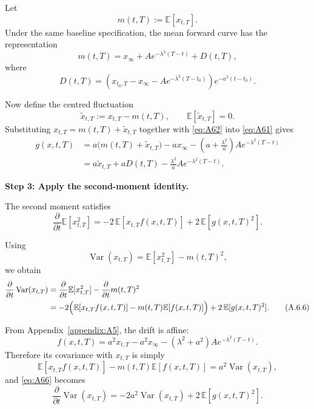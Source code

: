 \documentclass[12pt]{article}
\theoremstyle{statementstyle}
\begin{document}
\begin{appendices}
Let
\[
m(t,T):=\mathbb{E}[x_{t,T}].
\]
Under the same baseline specification, the mean forward curve has the
representation
\begin{equation}
m(t,T)
=
x_{\infty}
+
A e^{-\lambda^{2}(T-t)}
+
D(t,T),
\tag{A.6.2}\label{eq:A62}
\end{equation}
where
\begin{equation}
D(t,T)
=
\left(
x_{t_0,T}
-
x_{\infty}
-
A e^{-\lambda^{2}(T-t_0)}
\right)e^{-a^{2}(t-t_0)}.
\tag{A.6.3}\label{eq:A63}
\end{equation}

Now define the centred fluctuation
\[
\widetilde{x}_{t,T}:=x_{t,T}-m(t,T),
\qquad
\mathbb{E}[\widetilde{x}_{t,T}]=0.
\]
Substituting \(x_{t,T}=m(t,T)+\widetilde{x}_{t,T}\) together with
\eqref{eq:A62} into \eqref{eq:A61} gives
\begin{align}
g(x,t,T)
&=
a\bigl(m(t,T)+\widetilde{x}_{t,T}\bigr)
-
a x_{\infty}
-
\left(a+\frac{\lambda^{2}}{a}\right)A e^{-\lambda^{2}(T-t)}
\nonumber\\
&=
a\widetilde{x}_{t,T}
+
aD(t,T)
-
\frac{\lambda^{2}}{a}A e^{-\lambda^{2}(T-t)}.
\tag{A.6.4}\label{eq:A64}
\end{align}

\medskip
\noindent\textbf{Step 3: Apply the second-moment identity.}

The second moment satisfies
\begin{equation}
\frac{\partial}{\partial t}\mathbb{E}[x_{t,T}^{2}]
=
-2\,\mathbb{E}[x_{t,T}f(x,t,T)]
+
2\,\mathbb{E}[g(x,t,T)^{2}].
\tag{A.6.5}\label{eq:A65}
\end{equation}

Using
\[
\operatorname{Var}(x_{t,T})
=
\mathbb{E}[x_{t,T}^{2}] - m(t,T)^{2},
\]
we obtain
\begin{align}
\frac{\partial}{\partial t}\operatorname{Var}(x_{t,T})
&=
\frac{\partial}{\partial t}\mathbb{E}[x_{t,T}^{2}]
-
\frac{\partial}{\partial t}m(t,T)^{2}
\nonumber\\
&=
-2\Bigl(\mathbb{E}[x_{t,T}f(x,t,T)]-m(t,T)\mathbb{E}[f(x,t,T)]\Bigr)
+
2\,\mathbb{E}[g(x,t,T)^{2}].
\tag{A.6.6}\label{eq:A66}
\end{align}

From Appendix~\ref{appendix:A5}, the drift is affine:
\[
f(x,t,T)
=
a^{2}x_{t,T}
-
a^{2}x_{\infty}
-
(\lambda^{2}+a^{2})A e^{-\lambda^{2}(T-t)}.
\]
Therefore its covariance with \(x_{t,T}\) is simply
\[
\mathbb{E}[x_{t,T}f(x,t,T)]-m(t,T)\mathbb{E}[f(x,t,T)]
=
a^{2}\operatorname{Var}(x_{t,T}),
\]
and \eqref{eq:A66} becomes
\begin{equation}
\frac{\partial}{\partial t}\operatorname{Var}(x_{t,T})
=
-2a^{2}\operatorname{Var}(x_{t,T})
+
2\,\mathbb{E}[g(x,t,T)^{2}].
\tag{A.6.7}\label{eq:A67}
\end{equation}


\end{appendices}
\end{document}
